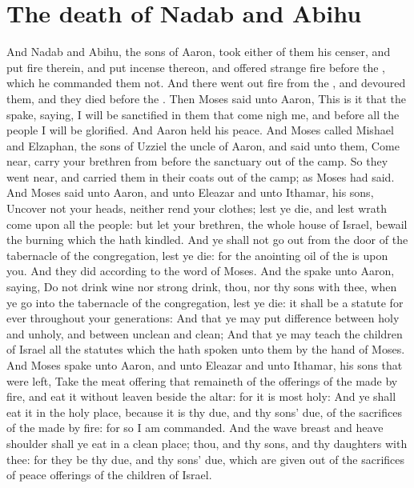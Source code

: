 \section*{The death of Nadab and Abihu}
\begin{biblechapter} %
\verse And Nadab and Abihu, the sons of Aaron, took either of them his censer, and put fire therein, and put incense thereon, and offered strange fire before the \LORD, which he commanded them not.
\verse And there went out fire from the \LORD, and devoured them, and they died before the \LORD.
\verse Then Moses said unto Aaron, This is it that the \LORD spake, saying, I will be sanctified in them that come nigh me, and before all the people I will be glorified. And Aaron held his peace.
\verse And Moses called Mishael and Elzaphan, the sons of Uzziel the uncle of Aaron, and said unto them, Come near, carry your brethren from before the sanctuary out of the camp.
\verse So they went near, and carried them in their coats out of the camp; as Moses had said.
\verse And Moses said unto Aaron, and unto Eleazar and unto Ithamar, his sons, Uncover not your heads, neither rend your clothes; lest ye die, and lest wrath come upon all the people: but let your brethren, the whole house of Israel, bewail the burning which the \LORD hath kindled.
\verse And ye shall not go out from the door of the tabernacle of the congregation, lest ye die: for the anointing oil of the \LORD is upon you. And they did according to the word of Moses.
\verse And the \LORD spake unto Aaron, saying,
\verse Do not drink wine nor strong drink, thou, nor thy sons with thee, when ye go into the tabernacle of the congregation, lest ye die: it shall be a statute for ever throughout your generations:
\verse And that ye may put difference between holy and unholy, and between unclean and clean;
\verse And that ye may teach the children of Israel all the statutes which the \LORD hath spoken unto them by the hand of Moses.
\verse And Moses spake unto Aaron, and unto Eleazar and unto Ithamar, his sons that were left, Take the meat offering that remaineth of the offerings of the \LORD made by fire, and eat it without leaven beside the altar: for it is most holy:
\verse And ye shall eat it in the holy place, because it is thy due, and thy sons' due, of the sacrifices of the \LORD made by fire: for so I am commanded.
\verse And the wave breast and heave shoulder shall ye eat in a clean place; thou, and thy sons, and thy daughters with thee: for they be thy due, and thy sons' due, which are given out of the sacrifices of peace offerings of the children of Israel.

\end{biblechapter}
